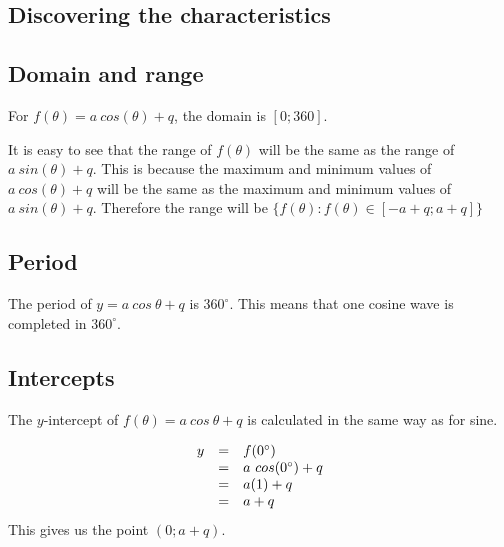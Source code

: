 \subsection*{Discovering the characteristics}
\subsection*{Domain and range}

For $f(\theta )=a~cos(\theta )+q$, the domain is $[0; 360]$.\par 
It is easy to see that the range of $f(\theta )$ will be the same as the range of $a~sin(\theta )+q$. This is because the maximum and minimum values of $a~cos(\theta )+q$ will be the same as the maximum and minimum values of $a~sin(\theta )+q$. Therefore the range will be $\{f(\theta): f(\theta) \in [-a+q; a+q]\}$ \par 

\subsection*{Period}
The period of $y=a~cos~\theta+q$ is $360^{\circ}$. This means that one cosine wave is completed in $360^{\circ}$. 

\subsection*{Intercepts}
\nopagebreak
The $y$-intercept of $f(\theta )=a~cos~\theta+q$ is calculated in the same way as for sine.\par 
\nopagebreak\noindent{}
\begin{equation*}
\begin{array}{ccl}\hfill y& =& f({0}^{\circ })\hfill \\
 & =& a~cos(0^{\circ })+q\hfill \\
 & =& a(1)+q\hfill \\
 & =& a+q\hfill 
\end{array}
\end{equation*}
This gives us the point $(0;a+q)$.

